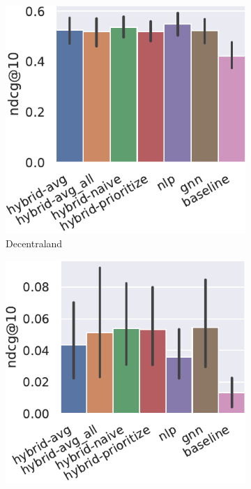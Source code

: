 \begin{figure}[t]
    \centering
    \begin{subfigure}{.24\linewidth}
        \includegraphics[width=\linewidth]{figures/resultados/7_all-metrics-Decentraland-ndcg@10.pdf}
        \caption{Decentraland}
    \end{subfigure}\hfill\begin{subfigure}{.24\linewidth}
        \includegraphics[width=\linewidth]{figures/resultados/7_all-metrics-DEAD FoundationsDAO-ndcg@10.pdf}

\end{subfigure}
\end{figure}
